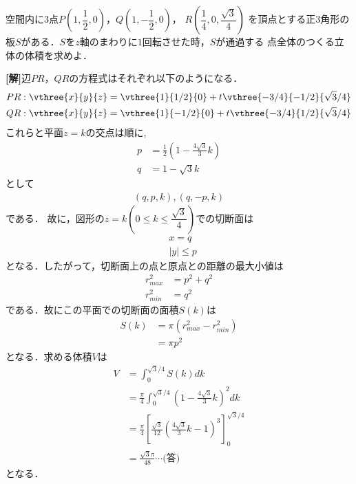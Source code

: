 \documentclass[a4j]{jarticle}
\begin{document}

\begin{oframed}
空間内に$3$点$P\left(1,\dfrac{1}{2},0\right)$，$Q\left(1,-\dfrac{1}{2},0\right)$，
$R\left(\dfrac{1}{4},0,\dfrac{\sqrt{3}}{4}\right)$
を頂点とする正$3$角形の板$S$がある．$S$を$z$軸のまわりに$1$回転させた時，$S$が通過する
点全体のつくる立体の体積を求めよ．
\end{oframed}

\setlength{\columnseprule}{0.4pt}
\begin{multicols}{2}
{\bf[解]}辺$PR$，$QR$の方程式はそれぞれ以下のようになる．
     \begin{align*}
     PR&:\vthree{x}{y}{z}=\vthree{1}{1/2}{0}+t\vthree{-3/4}{-1/2}{\sqrt{3}/4} \\	
     QR&:\vthree{x}{y}{z}=\vthree{1}{-1/2}{0}+t\vthree{-3/4}{1/2}{\sqrt{3}/4}
     \end{align*}
これらと平面$z=k$の交点は順に,
     \begin{align*}
     p&=\frac{1}{2}\left(1-\frac{4\sqrt{3}}{3}k\right)  \\
     q&=1-\sqrt{3}k
     \end{align*}
として
     \begin{align*}
     (q,p,k), (q,-p,k)
     \end{align*}
である．     
故に，図形の$z=k(0\le k\le \dfrac{\sqrt{3}}{4})$での切断面は
     \begin{align*}
     &x=q \\
     &|y|\le p 
     \end{align*}
となる．したがって，切断面上の点と原点との距離の最大小値は
     \begin{align*}
     r_{max}^2&=p^2+q^2 \\
     r_{min}^2&=q^2
     \end{align*}
である．故にこの平面での切断面の面積$S(k)$は
     \begin{align*}
     S(k)&=\pi(r_{max}^2- r_{min}^2) \\
     &=\pi p^2 
     \end{align*}
となる．求める体積$V$は
     \begin{align*}
     V&=\int_0^{\sqrt{3}/4}S(k)dk \\
     &=\frac{\pi}{4}\int_0^{\sqrt{3}/4}\left(1-\frac{4\sqrt{3}}{3}k\right)^2dk \\
     &=\frac{\pi}{4}\left[\frac{\sqrt{3}}{12}\left(\frac{4\sqrt{3}}{3}k-1\right)^3\right]_0^{\sqrt{3}/4} \\
     &=\frac{\sqrt{3}\pi}{48}\cdots\text{(答)}
     \end{align*}
となる．     
\newpage
\end{multicols}
\end{document}
